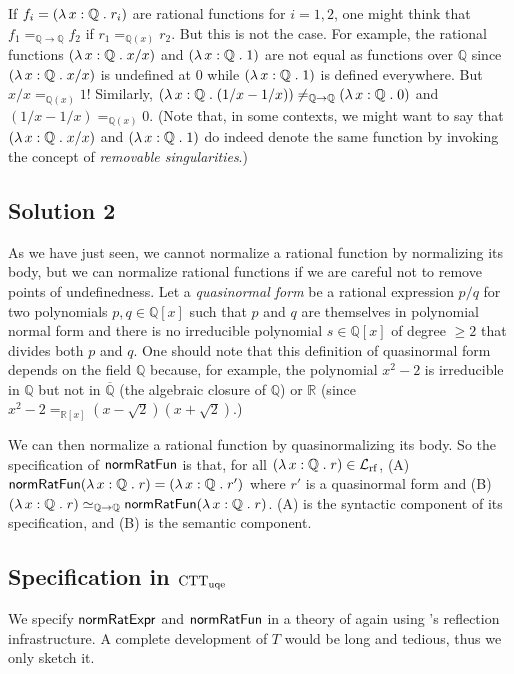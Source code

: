 \documentclass[fleqn]{llncs}
\newcommand{\QQ}{\ensuremath{\mathbb{Q}}}
\newcommand{\RR}{\ensuremath{\mathbb{R}}}
\newcommand{\NRE}{\ensuremath{\mname{normRatExpr}}}
\newcommand{\NRF}{\ensuremath{\mname{normRatFun}}}
\newcommand{\funQ}[1]{\ensuremath{\LambdaApp x : \QQ \mdot #1}}
\newcommand{\Langrf}{\ensuremath{\mathcal{L}}_{\rm rf}}
\begin{document}
If $f_i = (\funQ{r_i})$ are rational functions for $i=1,2$, one might
think that $f_1 =_{\QQ \rightarrow \QQ} f_2$ if $r_1 =_{\QQ(x)} r_2$.
But this is not the case.  For example, the rational functions
$(\funQ{x/x})$ and $(\funQ{1})$ are not equal as functions over $\QQ$
since $(\funQ{x/x})$ is undefined at 0 while $(\funQ{1})$ is defined
everywhere.  But $x/x =_{\QQ(x)} 1$! Similarly, $(\funQ{(1/x - 1/x)})
\not=_{\QQ \rightarrow \QQ} (\funQ{0})$ and $(1/x - 1/x) =_{\QQ(x)}
0$.  (Note that, in some contexts, we might want to say that
$(\funQ{x/x})$ and $(\funQ{1})$ do indeed denote the same function by
invoking the concept of \emph{removable singularities}.)

\subsection{Solution 2}

As we have just seen, we cannot normalize a rational function by
normalizing its body, but we can normalize rational functions if we
are careful not to remove points of undefinedness.  Let a
\emph{quasinormal form} be a rational expression $p/q$ for two
polynomials $p,q \in \QQ[x]$ such that $p$ and $q$ are themselves in
polynomial normal form and there is no irreducible polynomial $s \in
\QQ[x]$ of degree $\ge 2$ that divides both $p$ and $q$.  One should
note that this definition of quasinormal form depends on the field
$\QQ$ because, for example, the polynomial $x^2 - 2$ is irreducible in
$\QQ$ but not in $\overline{\QQ}$ (the algebraic closure of $\QQ$) or
$\RR$ (since $x^2 - 2 =_{\RR[x]} (x - \sqrt{2})(x + \sqrt{2})$.)

\bsp We can then normalize a rational function by quasinormalizing its
body.  So the specification of $\NRF$ is that, for all $(\funQ{r}) \in
\Langrf$, (A)~$\NRF(\funQ{r}) = (\funQ{r'})$ where $r'$ is a
quasinormal form and (B)~$(\funQ{r}) \simeq_{\QQ \rightarrow \QQ}
\NRF(\funQ{r})$.  (A) is the syntactic component of its specification,
and (B) is the semantic component.\esp

\subsection{Specification in ${\rm CTT}_{\rm uqe}$}

We specify {\NRE} and {\NRF} in a theory of {\churchuqe} again using
{\churchuqe}'s reflection infrastructure.  A complete development of
$T$ would be long and tedious, thus we only sketch it.
\end{document}
